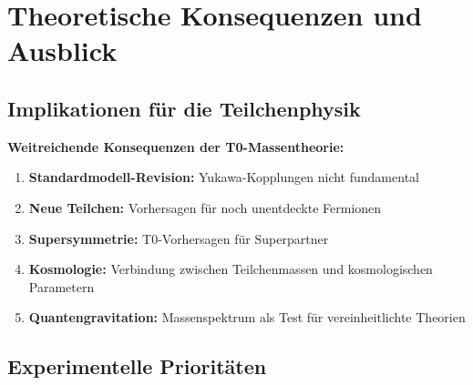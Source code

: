 \documentclass[12pt,a4paper]{article}
\begin{document}
	\section{Theoretische Konsequenzen und Ausblick}
	
	\subsection{Implikationen für die Teilchenphysik}
	
	\begin{warning}
		\textbf{Weitreichende Konsequenzen der T0-Massentheorie:}
		
		\begin{enumerate}
			\item \textbf{Standardmodell-Revision:} Yukawa-Kopplungen nicht fundamental
			
			\item \textbf{Neue Teilchen:} Vorhersagen für noch unentdeckte Fermionen
			
			\item \textbf{Supersymmetrie:} T0-Vorhersagen für Superpartner
			
			\item \textbf{Kosmologie:} Verbindung zwischen Teilchenmassen und kosmologischen Parametern
			
			\item \textbf{Quantengravitation:} Massenspektrum als Test für vereinheitlichte Theorien
		\end{enumerate}
	\end{warning}
	
	\subsection{Experimentelle Prioritäten}
	
\end{document}
